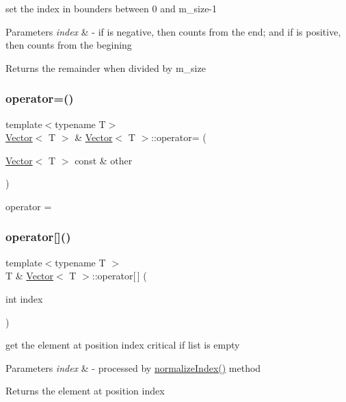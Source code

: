 set the index in bounders between 0 and m\+\_\+size-\/1 
\begin{DoxyParams}{Parameters}
{\em index} & -\/ if is negative, then counts from the end; and if is positive, then counts from the begining \\
\hline
\end{DoxyParams}
\begin{DoxyReturn}{Returns}
the remainder when divided by m\+\_\+size 
\end{DoxyReturn}
\mbox{\label{classVector_a0feef299594680034402e23ff28b9f45}} 
\subsubsection{\texorpdfstring{operator=()}{operator=()}}
{\footnotesize\ttfamily template$<$typename T$>$ \\
\hyperlink{classVector}{Vector}$<$ T $>$ \& \hyperlink{classVector}{Vector}$<$ T $>$\+::operator= (\begin{DoxyParamCaption}\item[{\hyperlink{classVector}{Vector}$<$ T $>$ const \&}]{other }\end{DoxyParamCaption})}



operator = 

\mbox{\label{classVector_a2054758707c08325ef160fd4dfc48ff7}} 
\subsubsection{\texorpdfstring{operator[]()}{operator[]()}\hspace{0.1cm}{\footnotesize\ttfamily [1/2]}}
{\footnotesize\ttfamily template$<$typename T $>$ \\
T \& \hyperlink{classVector}{Vector}$<$ T $>$\+::operator\mbox{[}$\,$\mbox{]} (\begin{DoxyParamCaption}\item[{int}]{index }\end{DoxyParamCaption})}

get the element at position index critical if list is empty 
\begin{DoxyParams}{Parameters}
{\em index} & -\/ processed by \hyperlink{classVector_a63f7ddd7328b13bc30b2243b50f70ec9}{normalize\+Index()} method \\
\hline
\end{DoxyParams}
\begin{DoxyReturn}{Returns}
the element at position index 
\end{DoxyReturn}
\mbox{\label{classVector_a491327d90df15af7ee79c6705f005491}} 
